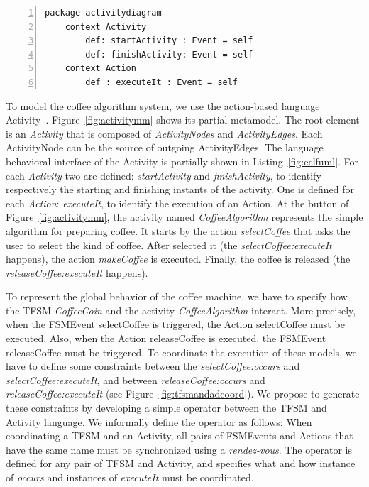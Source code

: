 	\begin{lstlisting}[language=ecl,
	caption={Partial \ecl specification of Activity Diagram},
	label={fig:eclfuml}, 
	basicstyle=\scriptsize\ttfamily, backgroundcolor=\color{LGrey}, numbers=left, xleftmargin=3pt, belowskip=-0.4em]
	package activitydiagram
	context Activity
		def: startActivity : Event = self
		def: finishActivity: Event = self
	context Action
		def : executeIt : Event = self
	\end{lstlisting}
To model the coffee algorithm system, we use the action-based language Activity~\cite{ttc15bib}. Figure~\ref{fig:activitymm} shows its partial metamodel. The root element is an \emph{Activity} that is composed of \emph{ActivityNodes} and \emph{ActivityEdges}. Each ActivityNode can be the source of outgoing ActivityEdges. The language behavioral interface of the Activity is partially shown in Listing~\ref{fig:eclfuml}. For each \emph{Activity} two \dse are defined: \emph{startActivity} and \emph{finishActivity}, to identify respectively the starting and finishing instants of the activity. One \dse is defined for each \emph{Action}: \emph{executeIt}, to identify the execution of an Action. At the button of Figure~\ref{fig:activitymm}, the activity named \emph{CoffeeAlgorithm} represents the simple algorithm for preparing coffee. It starts by the action \emph{selectCoffee} that asks the user to select the kind of coffee. After selected it (the \mse \emph{selectCoffee:executeIt} happens), the action \emph{makeCoffee} is executed. Finally, the coffee is released (the \mse \emph{releaseCoffee:executeIt} happens).

To represent the global behavior of the coffee machine, we have to specify how the TFSM \emph{CoffeeCoin} and the activity \emph{CoffeeAlgorithm} interact. More precisely, when the FSMEvent selectCoffee is triggered, the Action selectCoffee must be executed. Also, when the Action releaseCoffee is executed, the FSMEvent releaseCoffee must be triggered. To coordinate the execution of these models, we have to define some constraints between the \mse \emph{selectCoffee:occurs} and \emph{selectCoffee:executeIt}, and between \emph{releaseCoffee:occurs} and \emph{releaseCoffee:executeIt} (see Figure~\ref{fig:tfsmandadcoord}). We propose to generate these constraints by developing a simple \bcool operator between the TFSM and Activity language. We informally define the operator as follows: When coordinating a TFSM and an Activity, all pairs of FSMEvents and Actions that have the same name must be synchronized using a \emph{rendez-vous}. The operator is defined for any pair of TFSM and Activity, and specifies what and how instance of \dse \emph{occurs} and instances of \dse \emph{executeIt} must be coordinated. 

